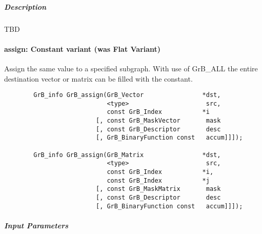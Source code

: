 \subparagraph{Description}

TBD

\paragraph{{\sf assign}: Constant variant (was Flat Variant)}

Assign the same value to a specified subgraph.  With use of {\sf GrB\_ALL} the entire
destination vector or matrix can be filled with the constant.


\begin{verbatim}
        GrB_info GrB_assign(GrB_Vector                *dst,
                            <type>                     src,
                            const GrB_Index           *i
                         [, const GrB_MaskVector       mask
                         [, const GrB_Descriptor       desc
                         [, GrB_BinaryFunction const   accum]]]);

        GrB_info GrB_assign(GrB_Matrix                *dst,
                            <type>                     src,
                            const GrB_Index           *i,
                            const GrB_Index           *j
                         [, const GrB_MaskMatrix       mask
                         [, const GrB_Descriptor       desc
                         [, GrB_BinaryFunction const   accum]]]);
\end{verbatim}

\subparagraph{Input Parameters}

